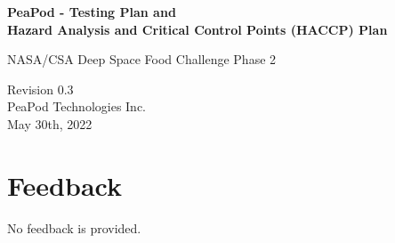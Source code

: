 \documentclass{../tex/report}
\begin{document}
\begin{titlepage}
    \begin{center}
        \vspace*{1.2cm}

        \textbf{\large{PeaPod - Testing Plan and\\Hazard Analysis and Critical Control Points (HACCP) Plan}}

        \vspace{0.5cm}

        NASA/CSA Deep Space Food Challenge Phase 2

        \vfill
        
        \vspace{.75cm}

        Revision 0.3\\
        PeaPod Technologies Inc.\\
        May 30th, 2022

    \end{center}
\end{titlepage}

\thispagestyle{plain}

\tableofcontents
\clearpage



\clearpage



\clearpage

\section{Feedback}

No feedback is provided.


\clearpage



\end{document}
